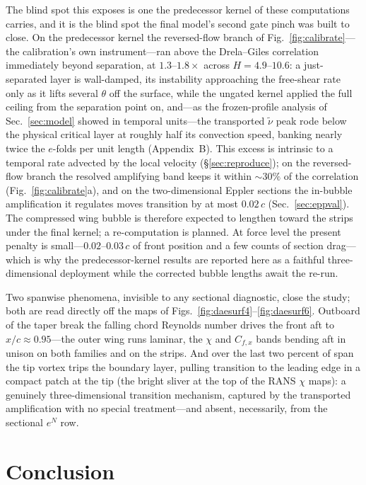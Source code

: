 \documentclass[journal]{new-aiaa}
\begin{document}
The blind spot this exposes is one the predecessor kernel of these
computations carries, and it is the blind spot the final model's second
gate pinch was built to close. On the predecessor kernel the
reversed-flow branch of Fig.~\ref{fig:calibrate}---the calibration's
own instrument---ran above the Drela--Giles correlation immediately
beyond separation, at $1.3$--$1.8\times$ across $H\!=\!4.9$--$10.6$: a
just-separated layer is wall-damped, its instability approaching the
free-shear rate only as it lifts several $\theta$ off the surface, while
the ungated kernel applied the full ceiling from the separation point
on, and---as the frozen-profile analysis of Sec.~\ref{sec:model} showed
in temporal units---the transported $\tilde\nu$ peak rode below the
physical critical layer at roughly half its convection speed, banking
nearly twice the $e$-folds per unit length (Appendix~B). This excess is intrinsic to a temporal rate advected by the
local velocity (\S\ref{sec:reproduce}); on the reversed-flow branch the
resolved amplifying band keeps it within $\sim\!30\%$ of the correlation
(Fig.~\ref{fig:calibrate}a), and on the two-dimensional Eppler
sections the in-bubble amplification it regulates moves transition by at
most $0.02\,c$ (Sec.~\ref{sec:eppval}). The compressed wing bubble is
therefore expected to lengthen toward the strips under the final kernel;
a re-computation is planned. At force level the present penalty is
small---$0.02$--$0.03\,c$ of front position and a few counts of section
drag---which is why the predecessor-kernel results are reported here as
a faithful three-dimensional deployment while the corrected bubble
lengths await the re-run.

Two spanwise phenomena, invisible to any sectional diagnostic, close
the study; both are read directly off the maps of
Figs.~\ref{fig:daesurf4}--\ref{fig:daesurf6}. Outboard of the taper
break the falling chord Reynolds number drives the front aft to
$x/c\!\approx\!0.95$---the outer wing runs laminar, the $\chi$ and
$C_{f,x}$ bands bending aft in unison on both families and on the
strips. And over the last two percent of span the tip vortex trips the
boundary layer, pulling transition to the leading edge in a compact
patch at the tip (the bright sliver at the top of the RANS $\chi$
maps): a genuinely three-dimensional transition mechanism, captured by
the transported amplification with no special treatment---and absent,
necessarily, from the sectional $e^N$ row.

\section{Conclusion}
\end{document}
